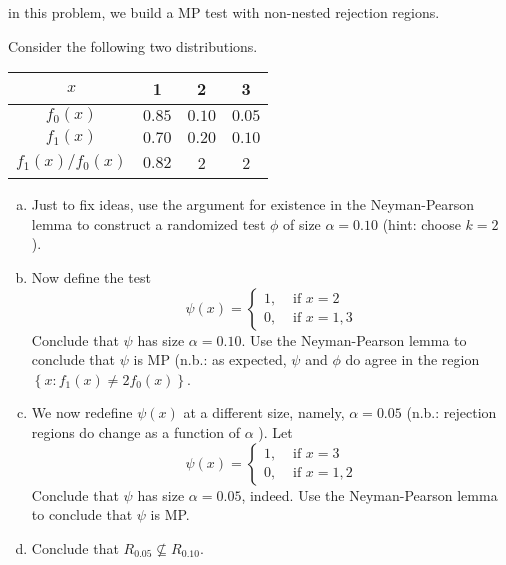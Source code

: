 \begin{ex}
     in this problem, we build a MP test with non-nested rejection regions. 

    Consider the following two distributions. 
    \begin{center}
        \begin{tabular}{cccc}
            \hline\(x\) & 1 & 2 & 3 \\
            \hline\(f_{0}(x)\) & \(0.85\) & \(0.10\) & \(0.05\) \\
            \(f_{1}(x)\) & \(0.70\) & \(0.20\) & \(0.10\) \\
            \hline\(f_{1}(x) / f_{0}(x)\) & \(0.82\) & 2 & 2 \\
            \hline
        \end{tabular}
    \end{center}
    \begin{enumerate}[(a)]
        \item Just to fix ideas, use the argument for existence in the Neyman-Pearson lemma to construct a randomized test \(\phi\) of size \(\alpha=0.10\) (hint: choose \(k=2\) ). 
        \item Now define the test
        \[
            \psi(x)=\left\{\begin{array}{lc}
            1, & \text { if } x=2 \\
            0, & \text { if } x=1,3
            \end{array}\right.
        \]
        Conclude that \(\psi\) has size \(\alpha=0.10\). Use the Neyman-Pearson lemma to conclude that \(\psi\) is MP (n.b.: as expected, \(\psi\) and \(\phi\) do agree in the region \(\left\{x: f_{1}(x) \neq 2 f_{0}(x)\right\}\). 
        \item We now redefine \(\psi(x)\) at a different size, namely, \(\alpha=0.05\) (n.b.: rejection regions do change as a function of \(\alpha\) ). Let
        \[
            \psi(x)=\left\{\begin{array}{lc}
            1, & \text { if } x=3 \\
            0, & \text { if } x=1,2
            \end{array}\right.
        \]
        Conclude that \(\psi\) has size \(\alpha=0.05\), indeed. Use the Neyman-Pearson lemma to conclude that \(\psi\) is MP. 
        \item Conclude that \(R_{0.05} \nsubseteq R_{0.10}\). 
    \end{enumerate}
\end{ex}








